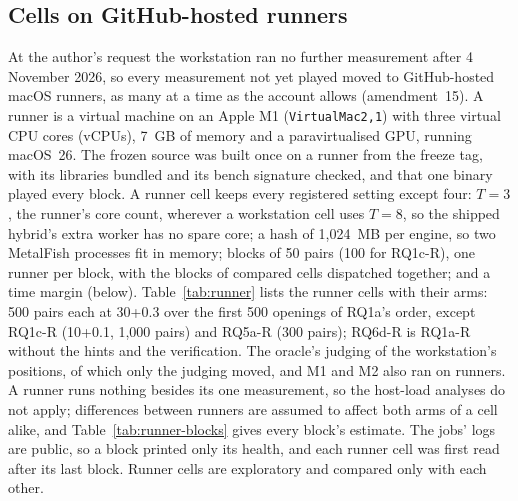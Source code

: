 \documentclass{article}
\newcommand{\MF}{MetalFish}
\begin{document}
\subsection{Cells on GitHub-hosted runners}
\label{sec:runners}
At the author's request the workstation ran no further measurement after 4 November 2026, so every measurement not yet played moved to GitHub-hosted macOS runners, as many at a time as the account allows (amendment~15). A runner is a virtual machine on an Apple M1 (\texttt{VirtualMac2,1}) with three virtual CPU cores (vCPUs), 7~GB of memory and a paravirtualised GPU, running macOS~26. The frozen source was built once on a runner from the freeze tag, with its libraries bundled and its bench signature checked, and that one binary played every block. A runner cell keeps every registered setting except four: $T = 3$, the runner's core count, wherever a workstation cell uses $T = 8$, so the shipped hybrid's extra worker has no spare core; a hash of 1{,}024~MB per engine, so two \MF{} processes fit in memory; blocks of 50 pairs (100 for RQ1c-R), one runner per block, with the blocks of compared cells dispatched together; and a time margin (below). Table~\ref{tab:runner} lists the runner cells with their arms: 500 pairs each at 30+0.3 over the first 500 openings of RQ1a's order, except RQ1c-R (10+0.1, 1{,}000 pairs) and RQ5a-R (300 pairs); RQ6d-R is RQ1a-R without the hints and the verification. The oracle's judging of the workstation's positions, of which only the judging moved, and M1 and M2 also ran on runners. A runner runs nothing besides its one measurement, so the host-load analyses do not apply; differences between runners are assumed to affect both arms of a cell alike, and Table~\ref{tab:runner-blocks} gives every block's estimate. The jobs' logs are public, so a block printed only its health, and each runner cell was first read after its last block. Runner cells are exploratory and compared only with each other.
\end{document}
